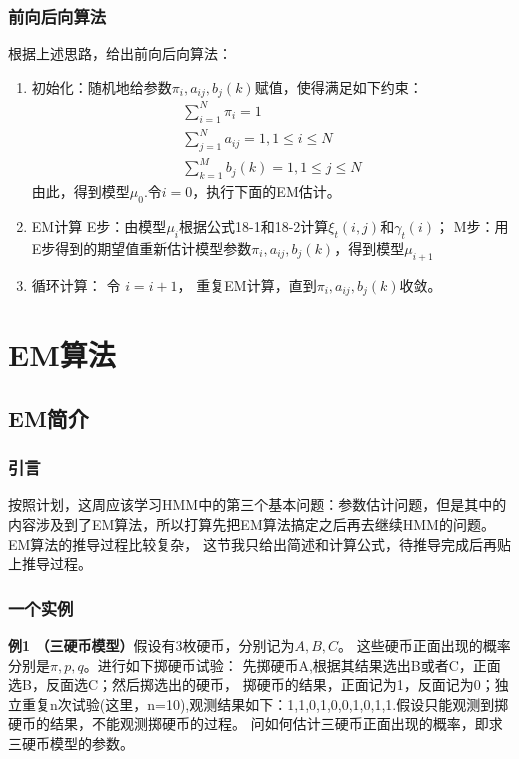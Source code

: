 \documentclass[a4paper,12pt]{book}
\begin{document}
    \subsection{前向后向算法}
    根据上述思路，给出前向后向算法：
    \begin{enumerate}
        \item 初始化：随机地给参数$\pi_i,a_{ij}, b_j(k)$赋值，使得满足如下约束：
        \begin{equation}
            \begin{split}
                \sum_{i=1}^N \pi_i=1\\
                \sum_{j=1}^N a_{ij} =1, 1 \le i \le N\\
                \sum_{k=1}^M b_j(k) =1, 1 \le j \le N
            \end{split}
        \end{equation}
        由此，得到模型$\mu_0$.令$i=0$，执行下面的EM估计。
        \item EM计算
        E步：由模型$\mu_i$根据公式18-1和18-2计算$\xi_t(i,j)$和$\gamma_t(i)$；
        M步：用E步得到的期望值重新估计模型参数$\pi_i,a_{ij}, b_j(k)$，得到模型$\mu_{i+1}$
        \item 循环计算：
        令 $i = i+1$， 重复EM计算，直到$\pi_i,a_{ij}, b_j(k)$收敛。
    \end{enumerate}

    \chapter{EM算法}
    \section{EM简介}

    \subsection{引言}
    按照计划，这周应该学习HMM中的第三个基本问题：参数估计问题，但是其中的内容涉及到了EM算法，所以打算先把EM算法搞定之后再去继续HMM的问题。EM算法的推导过程比较复杂，
    这节我只给出简述和计算公式，待推导完成后再贴上推导过程。

    \subsection{一个实例}
    \textbf{例1 （三硬币模型）}假设有3枚硬币，分别记为$A,B,C$。
    这些硬币正面出现的概率分别是$\pi, p,q$。进行如下掷硬币试验：
    先掷硬币A,根据其结果选出B或者C，正面选B，反面选C；然后掷选出的硬币，
    掷硬币的结果，正面记为1，反面记为0；独立重复n次试验(这里，n=10),观测结果如下：1,1,0,1,0,0,1,0,1,1.假设只能观测到掷硬币的结果，不能观测掷硬币的过程。
    问如何估计三硬币正面出现的概率，即求三硬币模型的参数。
\end{document}
